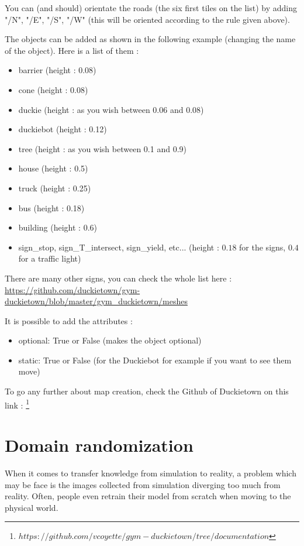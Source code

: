 You can (and should) orientate the roads (the six first tiles on the list) by adding "/N", "/E", "/S", "/W" (this will be oriented according to the rule given above).

The objects can be added as shown in the following example (changing the name of the object). Here is a list of them :

\begin{itemize}
    \item barrier (height : 0.08)
    \item cone (height : 0.08)
    \item duckie (height : as you wish between 0.06 and 0.08)
    \item duckiebot (height : 0.12)
    \item tree (height : as you wish between 0.1 and 0.9)
    \item house (height : 0.5)
    \item truck (height : 0.25)
    \item bus (height : 0.18)
    \item building (height : 0.6)
    \item sign\_stop, sign\_T\_intersect, sign\_yield, etc... (height : $0.18$ for the signs, $0.4$ for a traffic light)
\end{itemize}

There are many other signs, you can check the whole list here :
\url{https://github.com/duckietown/gym-duckietown/blob/master/gym\_duckietown/meshes}

It is possible to add the attributes :

\begin{itemize}
    \item optional: True or False (makes the object optional)
    \item static: True or False (for the Duckiebot for example if you want to see them move)
\end{itemize}

To go any further about map creation, check the Github of Duckietown on this link : \footnote{$https://github.com/vcoyette/gym-duckietown/tree/documentation$ }

\section{Domain randomization}

When it comes to transfer knowledge from simulation to reality, a problem which may be face is the images collected from simulation diverging too much from reality.
Often, people even retrain their model from scratch when moving to the physical world.

